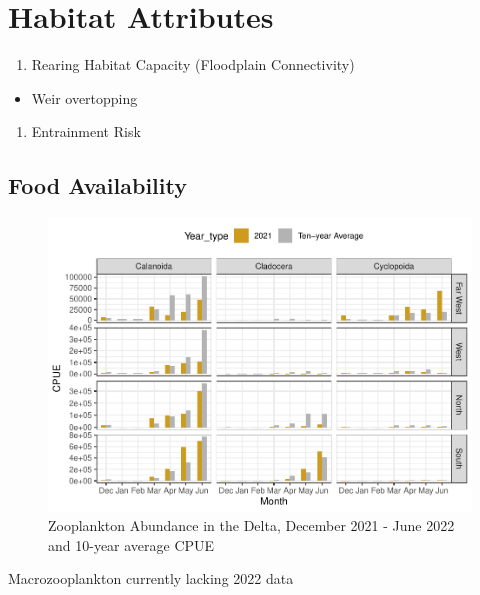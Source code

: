 \documentclass[
]{book}
\providecommand{\tightlist}{%
  \setlength{\itemsep}{0pt}\setlength{\parskip}{0pt}}
\theoremstyle{definition}
\theoremstyle{definition}
\theoremstyle{definition}
\theoremstyle{definition}
\theoremstyle{remark}
\begin{document}
\hypertarget{habitat-attributes-4}{%
\section{Habitat Attributes}\label{habitat-attributes-4}}

\begin{enumerate}
\def\labelenumi{\arabic{enumi}.}
\tightlist
\item
  Rearing Habitat Capacity (Floodplain Connectivity)
\end{enumerate}

\begin{itemize}
\tightlist
\item
  Weir overtopping
\end{itemize}

\begin{enumerate}
\def\labelenumi{\arabic{enumi}.}
\setcounter{enumi}{1}
\tightlist
\item
  Entrainment Risk
\end{enumerate}

\hypertarget{food-availability}{%
\subsection{Food Availability}\label{food-availability}}

\begin{figure}
\centering
\includegraphics{_main_files/figure-latex/meso-fig-1.pdf}
\caption{\label{fig:meso-fig}Zooplankton Abundance in the Delta, December 2021 - June 2022 and 10-year average CPUE}
\end{figure}

Macrozooplankton currently lacking 2022 data
\end{document}
